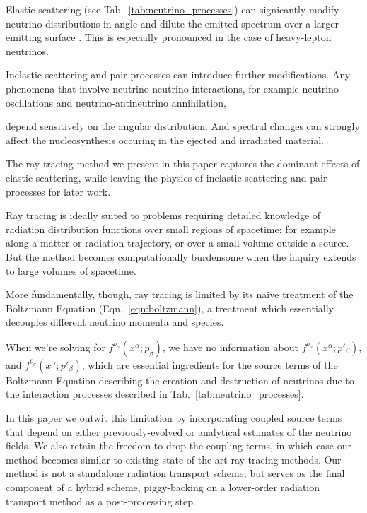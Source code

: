 \documentclass[aps,floatfix,prd,superscriptaddress,twocolumn]{revtex4-1}
\newcommand{\todo}[1]{\marginpar{\tiny{\textcolor{red}{#1}}}}
\renewcommand\todo[1]{} %
\begin{document}
Elastic scattering (see Tab.~\ref{tab:neutrino_processes}) can signicantly
modify neutrino distributions in angle and dilute the emitted spectrum over a
larger emitting surface \citep{pere2016-asl}.
This is especially pronounced in the case of heavy-lepton neutrinos.
\todo{cite}
Inelastic scattering and pair processes can introduce further modifications.
Any phenomena that involve neutrino-neutrino interactions,
for example neutrino oscillations and neutrino-antineutrino annihilation,
\todo{cite}
depend sensitively on the angular distribution.
And spectral changes can strongly affect the nucleosynthesis
occuring in the ejected and irradiated material.
\todo{justify these statements}
The ray tracing method we present in this paper captures the dominant effects
of elastic scattering, while leaving the physics of inelastic scattering and
pair processes for later work.

Ray tracing is ideally suited to problems requiring detailed knowledge of
radiation distribution functions over small regions of spacetime:
for example along a matter or radiation trajectory,
or over a small volume outside a source.
But the method becomes computationally burdensome when the inquiry extends
to large volumes of spacetime.

More fundamentally, though, ray tracing is limited by its naive
treatment of the Boltzmann Equation (Eqn.~\ref{eqn:boltzmann}),
a treatment which essentially decouples different neutrino momenta and species.
\todo{clarify how momenta are decoupled}
When we're solving for $f^{\nu_\sigma}(x^\alpha;p_\beta)$, we have no
information about $f^{\nu_\sigma}(x^\alpha;p'_\beta)$, and
$f^{\bar{\nu}_\sigma}(x^\alpha;p'_\beta)$, which are essential ingredients
for the source terms of the Boltzmann Equation describing the creation and
destruction of neutrinos due to the interaction processes described in
Tab.~\ref{tab:neutrino_processes}.

In this paper we outwit this limitation by incorporating coupled source terms
that depend on either previously-evolved or analytical
estimates of the neutrino fields.
We also retain the freedom to drop the coupling terms, in which case our method
becomes similar to existing state-of-the-art ray tracing methods.
Our method is not a standalone radiation transport scheme,
but serves as the final component of a hybrid scheme,
piggy-backing on a lower-order radiation transport method as a
post-processing step.
\end{document}
